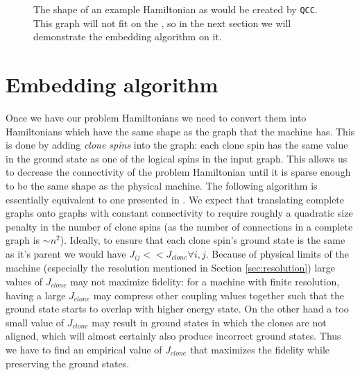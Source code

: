 \begin{figure}
	\begin{center}
	\end{center}
	\caption[Embedding example]{The shape of an example Hamiltonian as would be created by \texttt{QCC}.  This graph will not fit on the \machine, so in the next section we will demonstrate the embedding algorithm on it.}
	\label{fig:eg_embed}
\end{figure}

\section{Embedding algorithm}
\label{sec:embed_algo}
Once we have our problem Hamiltonians we need to convert them into Hamiltonians which have the same shape as the graph that the \machine machine has.  This is done by adding \emph{clone spins} into the graph: each clone spin has the same value in the ground state as one of the logical spins in the input graph.  
This allows us to decrease the connectivity of the problem Hamiltonian until it is sparse enough to be the same shape as the physical machine.  The following algorithm is essentially equivalent to one presented in \cite{choi1}.
We expect that translating complete graphs onto graphs with constant connectivity to require roughly a quadratic size penalty in the number of clone spins (as the number of connections in a complete graph is $\sim n^2$).
Ideally, to ensure that each clone spin's ground state is the same as it's parent we would have $J_{ij} << J_{clone} \forall i,j$.  Because of physical limits of the machine (especially the resolution mentioned in Section \ref{sec:resolution}) large values of $J_{clone}$ may not maximize fidelity: for a machine with finite resolution, having a large $J_{clone}$ may compress other coupling values together such that the ground state starts to overlap with higher energy state.  On the other hand a too small value of $J_{clone}$ may result in ground states in which the clones are not aligned, which will almost certainly also produce incorrect ground states. Thus we have to find an empirical value of $J_{clone}$ that maximizes the fidelity while preserving the ground states.

